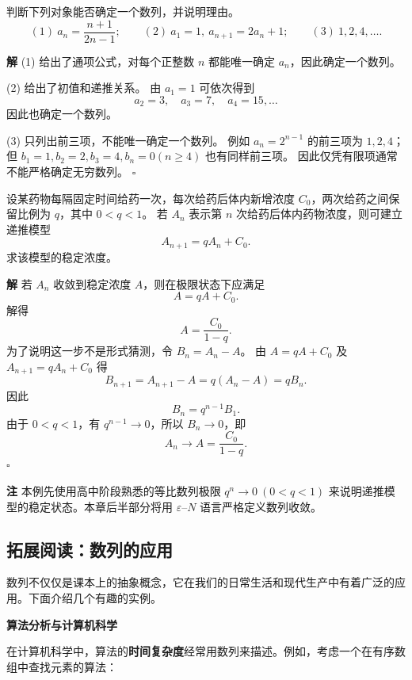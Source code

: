 \documentclass[fontset=fandol]{ctexart}
\newenvironment{solution}{\par\noindent\textbf{解}\quad}{\hfill$\square$\par\vspace{0.8em}}
\newenvironment{remark}{\par\noindent\textbf{注}\quad}{\par\vspace{0.8em}}
\begin{document}
\begin{example}
判断下列对象能否确定一个数列，并说明理由。
\[
(1)\ a_n=\frac{n+1}{2n-1};\qquad
(2)\ a_1=1,\ a_{n+1}=2a_n+1;\qquad
(3)\ 1,2,4,\ldots .
\]
\end{example}
\begin{solution}
(1) 给出了通项公式，对每个正整数 $n$ 都能唯一确定 $a_n$，因此确定一个数列。

(2) 给出了初值和递推关系。 由 $a_1=1$ 可依次得到
\[
a_2=3,\quad a_3=7,\quad a_4=15,\ldots
\]
因此也确定一个数列。

(3) 只列出前三项，不能唯一确定一个数列。 例如 $a_n=2^{n-1}$ 的前三项为 $1,2,4$；但 $b_1=1,b_2=2,b_3=4,b_n=0(n\ge4)$ 也有同样前三项。 因此仅凭有限项通常不能严格确定无穷数列。
\end{solution}

\begin{example}
设某药物每隔固定时间给药一次，每次给药后体内新增浓度 $C_0$，两次给药之间保留比例为 $q$，其中 $0<q<1$。 若 $A_n$ 表示第 $n$ 次给药后体内药物浓度，则可建立递推模型
\[
A_{n+1}=qA_n+C_0.
\]
求该模型的稳定浓度。
\end{example}
\begin{solution}
若 $A_n$ 收敛到稳定浓度 $A$，则在极限状态下应满足
\[
A=qA+C_0.
\]
解得
\[
A=\frac{C_0}{1-q}.
\]
为了说明这一步不是形式猜测，令 $B_n=A_n-A$。 由 $A=qA+C_0$ 及 $A_{n+1}=qA_n+C_0$ 得
\[
B_{n+1}=A_{n+1}-A=q(A_n-A)=qB_n.
\]
因此
\[
B_n=q^{n-1}B_1.
\]
由于 $0<q<1$，有 $q^{n-1}\to0$，所以 $B_n\to0$，即
\[
A_n\to A=\frac{C_0}{1-q}.
\]
\end{solution}

\begin{remark}
本例先使用高中阶段熟悉的等比数列极限 $q^n\to0\ (0<q<1)$ 来说明递推模型的稳定状态。本章后半部分将用 $\varepsilon$--$N$ 语言严格定义数列收敛。
\end{remark}



\subsection*{拓展阅读：数列的应用}

数列不仅仅是课本上的抽象概念，它在我们的日常生活和现代生产中有着广泛的应用。下面介绍几个有趣的实例。

\textbf{算法分析与计算机科学}

在计算机科学中，算法的\textbf{时间复杂度}经常用数列来描述。例如，考虑一个在有序数组中查找元素的算法：
\end{document}
